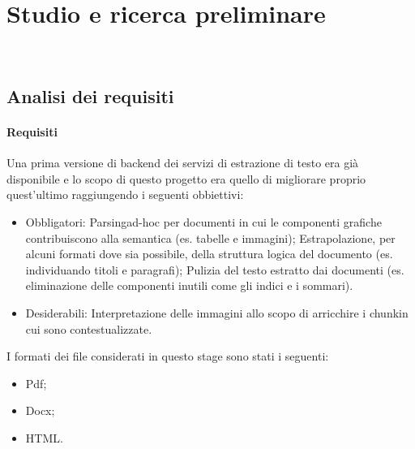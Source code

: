 \chapter{Studio e ricerca preliminare}
\label{cap:analisi-preliminare}

 \\

\section{Analisi dei requisiti}

\subsubsection{Requisiti}
Una prima versione di backend dei servizi di estrazione di testo era già disponibile e lo scopo di questo progetto era quello di migliorare proprio quest'ultimo raggiungendo i seguenti obbiettivi:

\begin{itemize}
    \item Obbligatori:
    \subitem \gls{Parsing}\glsfirstoccur ad-hoc per documenti in cui le componenti grafiche contribuiscono alla semantica (es. tabelle e immagini);
    \subitem Estrapolazione, per alcuni formati dove sia possibile, della struttura logica del documento (es. individuando titoli e paragrafi);
    \subitem Pulizia del testo estratto dai documenti (es. eliminazione delle componenti inutili come gli indici e i sommari).
    \item Desiderabili:
    \subitem Interpretazione delle immagini allo scopo di arricchire i \gls{chunk}\glsfirstoccur in cui sono contestualizzate. 
\end{itemize}

I formati dei file considerati in questo stage sono stati i seguenti:
\begin{itemize}
    \item Pdf;
    \item Docx;
    \item HTML.
\end{itemize}

